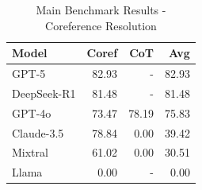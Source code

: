 \begin{table}[htbp]
\centering
\caption{Main Benchmark Results - Coreference Resolution}
\label{tab:coref_main_results}
\begin{tabular}{lrrr}
\toprule
Model & Coref & CoT & \textbf{Avg} \\
\midrule
GPT-5 & 82.93 & - & 82.93 \\
DeepSeek-R1 & 81.48 & - & 81.48 \\
GPT-4o & 73.47 & 78.19 & 75.83 \\
Claude-3.5 & 78.84 & 0.00 & 39.42 \\
Mixtral & 61.02 & 0.00 & 30.51 \\
Llama & 0.00 & - & 0.00 \\
\bottomrule
\end{tabular}
\end{table}
